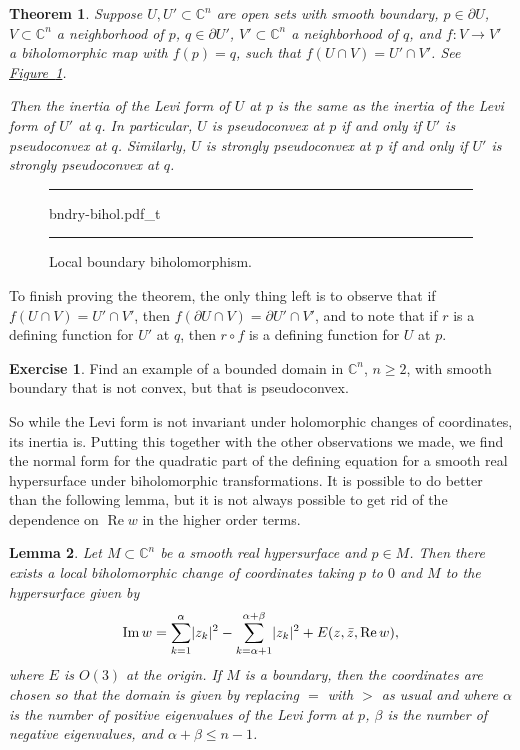 \documentclass[12pt,openany]{book}
\newcommand{\avoidbreak}{\postdisplaypenalty=100}
\renewcommand{\Re}{\operatorname{Re}}
\renewcommand{\Im}{\operatorname{Im}}
\newcommand{\sabs}[1]{\lvert {#1} \rvert}
\newcommand{\C}{{\mathbb{C}}}
\theoremstyle{plain}
\newtheorem{thm}{Theorem}[section]
\newtheorem{lemma}[thm]{Lemma}
\theoremstyle{remark}
\theoremstyle{definition}
\newenvironment{exbox}{%
    \def\FrameCommand{\vrule width 1pt \relax\hspace{10pt}}%
    \MakeFramed{\advance\hsize-\width\FrameRestore}%
}{%
    \endMakeFramed
}
\newenvironment{myfig}{%
\begin{figure}[h!t]
\noindent\rule{\textwidth}{0.5pt}\vspace{12pt}\par\centering}%
{\par\noindent\rule{\textwidth}{0.5pt}
\end{figure}}
\theoremstyle{exercise}
\newtheorem{exercise}{Exercise}[section]
\theoremstyle{example}
\newcommand{\figureref}[1]{\hyperref[#1]{Figure~\ref*{#1}}}
\begin{document}
\begin{thm}
\pagebreak[2]
Suppose $U, U' \subset \C^n$ are open sets with smooth boundary,
$p \in \partial U$, $V \subset \C^n$ a neighborhood of $p$,
$q \in \partial U'$, $V' \subset \C^n$ a neighborhood of $q$,
and $f \colon V \to V'$ a biholomorphic map with $f(p) = q$, such that
$f(U \cap V) = U' \cap V'$.
See \figureref{fig:bndry-bihol}.

Then the inertia of the Levi form of $U$ at $p$ is the same as the inertia of
the Levi form of $U'$ at $q$.
In particular, $U$ is pseudoconvex at $p$ if and only if $U'$ is pseudoconvex at $q$.
Similarly,
$U$ is strongly pseudoconvex at $p$ if and only if $U'$ is strongly pseudoconvex at $q$.
\end{thm}

\begin{myfig}
{bndry-bihol.pdf_t}
\caption{Local boundary biholomorphism.\label{fig:bndry-bihol}}
\end{myfig}

To finish proving the theorem, the only thing left is to observe that if
$f(U \cap V) = U' \cap V'$, then $f(\partial U \cap V) = \partial U' \cap
V'$, and to note that if $r$ is a defining function for $U'$ at $q$,
then $r \circ f$ is a defining function for $U$ at $p$.

\begin{exbox}
\begin{exercise}
Find an example of a bounded domain in $\C^n$, $n \geq 2$, with smooth boundary that is not convex,
but that is pseudoconvex.
\end{exercise}
\end{exbox}

So while the Levi form is not invariant under holomorphic changes of coordinates,
its inertia is.
Putting this together with the other observations we made,
we find the normal form for the
quadratic part of the defining equation for a smooth real hypersurface
under biholomorphic transformations.
It is possible to do better than the following lemma, but it is not always possible
to get rid of the dependence on $\Re w$ in the higher order terms.

\begin{lemma} \label{lemma:normformquad}
Let $M \subset \C^n$ be a smooth real hypersurface and $p \in M$.  Then there
exists a local biholomorphic change of coordinates taking $p$ to $0$
and $M$ to the hypersurface given by
\begin{equation*}
\Im w = \sum_{k=1}^\alpha \sabs{z_k}^2 - \sum_{k=\alpha+1}^{\alpha+\beta}
\sabs{z_k}^2 +
E(z,\bar{z},\Re w) ,
\avoidbreak
\end{equation*}
where $E$ is $O(3)$ at the origin.
If $M$ is a boundary, then the coordinates are chosen so that
the domain is given by replacing $=$ with $>$ as usual and where
$\alpha$ is the number of positive eigenvalues of the Levi form at $p$,
$\beta$ is the number of negative eigenvalues, and $\alpha+\beta \leq n-1$.
\end{lemma}
\end{document}
